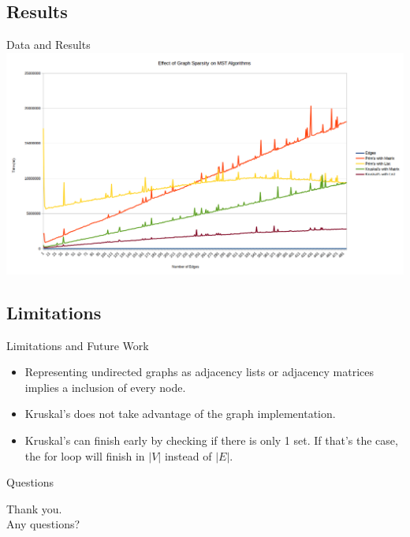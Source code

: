 \documentclass{beamer}
\begin{document}
\subsection{Results}
\begin{frame}{Data and Results}
    \includegraphics[width=\textwidth]{widegraph}
\end{frame}

\subsection{Limitations}
\begin{frame}{Limitations and Future Work}
    \begin{itemize}
    \item Representing undirected graphs as adjacency lists or adjacency
    matrices implies a inclusion of every node.
    \item Kruskal's does not take advantage of the graph implementation.
    \item Kruskal's can finish early by checking if there is only 1 set. If
    that's the case, the for loop will finish in $|V|$ instead of $|E|$.
    \end{itemize}
\end{frame}

\begin{frame}{Questions}
    \begin{center}
    Thank you.\\
    Any questions?
    \end{center}
\end{frame}
\end{document}
